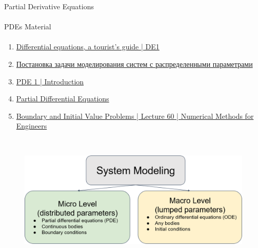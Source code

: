 \documentclass[aspectratio=169]{beamer}
\begin{document}
\begin{frame}[t]{Partial Derivative Equations}
    \framesubtitle{}

\end{frame}

\begin{frame}[t]{PDEs Material}
    \framesubtitle{}
    \begin{enumerate}
        \item \href{https://www.youtube.com/playlist?list=PLZHQObOWTQDNPOjrT6KVlfJuKtYTftqH6}{Differential equations, a tourist's guide | DE1}
        \item \href{http://bigor.bmstu.ru/?cnt/?doc=Mkr/post_st_old.mod/?cou=Mkr/base.cou}{Постановка задачи моделирования систем с распределенными параметрами}
        \item \href{https://www.youtube.com/playlist?list=PLF6061160B55B0203}{PDE 1 | Introduction}
        \item \href{https://youtu.be/afNZj5URZsc}{Partial Differential Equations}
        \item \href{https://youtu.be/tMO28AakkZ8}{Boundary and Initial Value Problems | Lecture 60 | Numerical Methods for Engineers}
    \end{enumerate}
\end{frame}

\begin{frame}[t]{}
    \framesubtitle{}
    \begin{figure}[H]
        \centering\includegraphics[height=6cm,width=1\textwidth,keepaspectratio]{system_modeling.png}
        \label{fig:system_modeling.png}
    \end{figure}
\end{frame}
\end{document}
